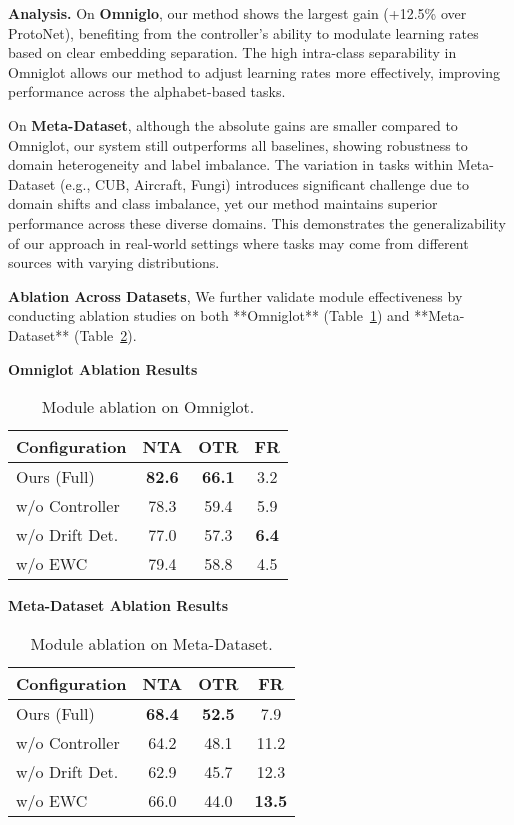 \documentclass[conference]{IEEEtran}
\begin{document}
\textbf{Analysis.}  
On \textbf{Omniglo}, our method shows the largest gain (+12.5\% over ProtoNet), benefiting from the controller's ability to modulate learning rates based on clear embedding separation. The high intra-class separability in Omniglot allows our method to adjust learning rates more effectively, improving performance across the alphabet-based tasks.

On \textbf{Meta-Dataset}, although the absolute gains are smaller compared to Omniglot, our system still outperforms all baselines, showing robustness to domain heterogeneity and label imbalance. The variation in tasks within Meta-Dataset (e.g., CUB, Aircraft, Fungi) introduces significant challenge due to domain shifts and class imbalance, yet our method maintains superior performance across these diverse domains. This demonstrates the generalizability of our approach in real-world settings where tasks may come from different sources with varying distributions.

\textbf{Ablation Across Datasets}, 
We further validate module effectiveness by conducting ablation studies on both **Omniglot** (Table~\ref{tab:ablation_omniglot}) and **Meta-Dataset** (Table~\ref{tab:ablation_meta}).

\vspace{0.5em}
\noindent\textbf{Omniglot Ablation Results}

\begin{table}[ht]
\centering
\caption{Module ablation on Omniglot.}
\begin{tabular}{lccc}
\toprule
\textbf{Configuration} & NTA & OTR & FR \\
\midrule
Ours (Full)         & \textbf{82.6} & \textbf{66.1} & 3.2 \\
\quad w/o Controller& 78.3 & 59.4 & 5.9 \\
\quad w/o Drift Det.& 77.0 & 57.3 & \textbf{6.4} \\
\quad w/o EWC       & 79.4 & 58.8 & 4.5 \\
\bottomrule
\end{tabular}
\label{tab:ablation_omniglot}
\end{table}


\vspace{0.5em}
\noindent\textbf{Meta-Dataset Ablation Results}

\begin{table}[ht]
\centering
\caption{Module ablation on Meta-Dataset.}
\begin{tabular}{lccc}
\toprule
\textbf{Configuration} & NTA & OTR & FR \\
\midrule
Ours (Full)         & \textbf{68.4} & \textbf{52.5} & 7.9 \\
\quad w/o Controller& 64.2 & 48.1 & 11.2 \\
\quad w/o Drift Det.& 62.9 & 45.7 & 12.3 \\
\quad w/o EWC       & 66.0 & 44.0 & \textbf{13.5} \\
\bottomrule
\end{tabular}
\label{tab:ablation_meta}
\end{table}
\end{document}
